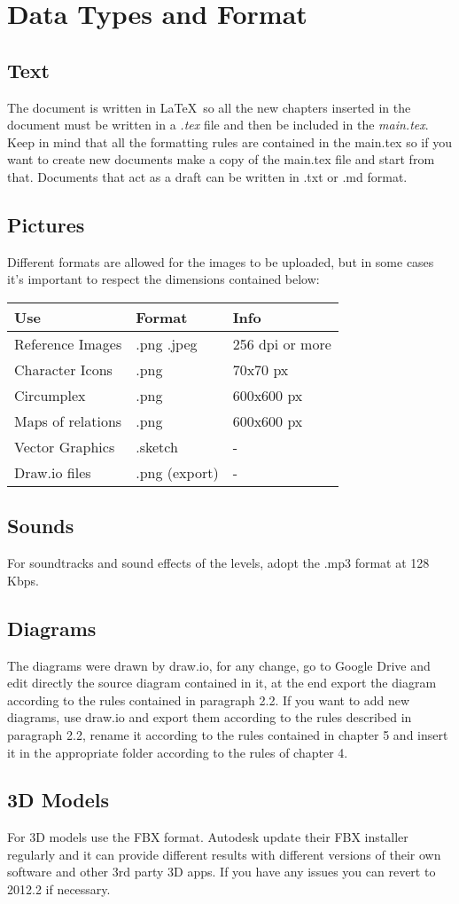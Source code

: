 \section{Data Types and Format}

\subsection{Text}
The document is written in \LaTeX\ so all the new chapters inserted in the document must be written in a \textit{.tex} file and then be included in the \textit{main.tex}. Keep in mind that all the formatting rules are contained in the main.tex so if you want to create new documents make a copy of the main.tex file and start from that. Documents that act as a draft can be written in .txt or .md format.

\subsection{Pictures}
Different formats are allowed for the images to be uploaded, but in some cases it's important to respect the dimensions contained below:

\begin{center}
	\begin{tabular}[c]{| p{8cm} | p{3cm} | p{3cm} |}
		\hline
		\textbf{Use} & \textbf{Format}  & \textbf{Info}\\
		\hline
		Reference Images & .png .jpeg & 256 dpi or more \\
		\hline
		Character Icons & .png & 70x70 px\\
		\hline
		Circumplex & .png & 600x600 px \\
		\hline
		Maps of relations & .png & 600x600 px \\
		\hline
		Vector Graphics & .sketch & - \\
		\hline
		Draw.io files & .png (export) & - \\
		\hline
	\end{tabular}
\end{center}

\subsection{Sounds}
For soundtracks and sound effects of the levels, adopt the .mp3 format at 128 Kbps.

\subsection{Diagrams}
The diagrams were drawn by draw.io, for any change, go to Google Drive and edit directly the source diagram contained in it, at the end export the diagram according to the rules contained in paragraph 2.2. If you want to add new diagrams, use draw.io and export them according to the rules described in paragraph 2.2, rename it according to the rules contained in chapter 5 and insert it in the appropriate folder according to the rules of chapter 4.

\subsection{3D Models}
For 3D models use the FBX format. Autodesk update their FBX installer regularly and it can provide different results with different versions of their own software and other 3rd party 3D apps. If you have any issues you can revert to 2012.2 if necessary.

